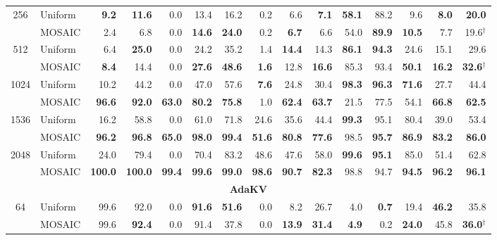 \begin{table}[tp]
\begin{tabular}{@{} c l rrrrrrrrrrrrr @{}}
    \cmidrule(l){1-15}
    \multirow{2}{*}{256} & Uniform & \textbf{9.2} & \textbf{11.6} & 0.0 & 13.4 & 16.2 & 0.2 & 6.6 & \textbf{7.1} & \textbf{58.1} & 88.2 & 9.6 & \textbf{8.0} & \textbf{20.0} \\
     & MOSAIC & 2.4 & 6.8 & 0.0 & \textbf{14.6} & \textbf{24.0} & 0.2 & \textbf{6.7} & 6.6 & 54.0 & \textbf{89.9} & \textbf{10.5} & 7.7 & 19.6$^\dagger$ \\
    \cmidrule(l){1-15}
    \multirow{2}{*}{512} & Uniform & 6.4 & \textbf{25.0} & 0.0 & 24.2 & 35.2 & 1.4 & \textbf{14.4} & 14.3 & \textbf{86.1} & \textbf{94.3} & 24.6 & 15.1 & 29.6 \\
     & MOSAIC & \textbf{8.4} & 14.4 & 0.0 & \textbf{27.6} & \textbf{48.6} & \textbf{1.6} & 12.8 & \textbf{16.6} & 85.3 & 93.4 & \textbf{50.1} & \textbf{16.2} & \textbf{32.6}$^\dagger$ \\
    \cmidrule(l){1-15}
    \multirow{2}{*}{1024} & Uniform & 10.2 & 44.2 & 0.0 & 47.0 & 57.6 & \textbf{7.6} & 24.8 & 30.4 & \textbf{98.3} & \textbf{96.3} & \textbf{71.6} & 27.7 & 44.4 \\
     & MOSAIC & \textbf{96.6} & \textbf{92.0} & \textbf{63.0} & \textbf{80.2} & \textbf{75.8} & 1.0 & \textbf{62.4} & \textbf{63.7} & 21.5 & 77.5 & 54.1 & \textbf{66.8} & \textbf{62.5} \\
    \cmidrule(l){1-15}
    \multirow{2}{*}{1536} & Uniform & 16.2 & 58.8 & 0.0 & 61.0 & 71.8 & 24.6 & 35.6 & 44.4 & \textbf{99.3} & 95.1 & 80.4 & 39.0 & 53.4 \\
     & MOSAIC & \textbf{96.2} & \textbf{96.8} & \textbf{65.0} & \textbf{98.0} & \textbf{99.4} & \textbf{51.6} & \textbf{80.8} & \textbf{77.6} & 98.5 & \textbf{95.7} & \textbf{86.9} & \textbf{83.2} & \textbf{86.0} \\
    \cmidrule(l){1-15}
    \multirow{2}{*}{2048} & Uniform & 24.0 & 79.4 & 0.0 & 70.4 & 83.2 & 48.6 & 47.6 & 58.0 & \textbf{99.6} & \textbf{95.1} & 85.0 & 51.4 & 62.8 \\
     & MOSAIC & \textbf{100.0} & \textbf{100.0} & \textbf{99.4} & \textbf{99.6} & \textbf{99.0} & \textbf{98.6} & \textbf{90.7} & \textbf{82.3} & 98.8 & 94.7 & \textbf{94.5} & \textbf{96.2} & \textbf{96.1} \\
    \midrule
    \multicolumn{15}{c}{\textbf{AdaKV}} \\
    \midrule
    \multirow{2}{*}{64} & Uniform & 99.6 & 92.0 & 0.0 & \textbf{91.6} & \textbf{51.6} & 0.0 & 8.2 & 26.7 & 4.0 & \textbf{0.7} & 19.4 & \textbf{46.2} & 35.8 \\
     & MOSAIC & 99.6 & \textbf{92.4} & 0.0 & 91.4 & 37.8 & 0.0 & \textbf{13.9} & \textbf{31.4} & \textbf{4.9} & 0.2 & \textbf{24.0} & 45.8 & \textbf{36.0}$^\dagger$ \\

\end{tabular}
\end{table}
